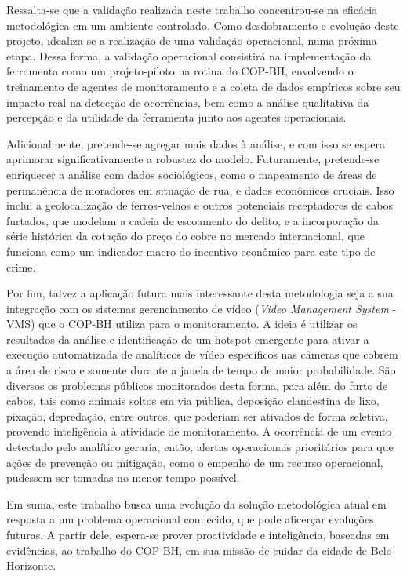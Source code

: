 Ressalta-se que a validação realizada neste trabalho concentrou-se na eficácia metodológica em um ambiente controlado. Como desdobramento e evolução deste projeto, idealiza-se a realização de uma validação operacional, numa próxima etapa. Dessa forma, a validação operacional consistirá na implementação da ferramenta como um projeto-piloto na rotina do COP-BH, envolvendo o treinamento de agentes de monitoramento e a coleta de dados empíricos sobre seu impacto real na detecção de ocorrências, bem como a análise qualitativa da percepção e da utilidade da ferramenta junto aos agentes operacionais.

Adicionalmente, pretende-se agregar mais dados à análise, e com isso se espera aprimorar significativamente a robustez do modelo. Futuramente, pretende-se enriquecer a análise com dados sociológicos, como o mapeamento de áreas de permanência de moradores em situação de rua, e dados econômicos cruciais. Isso inclui a geolocalização de ferros-velhos e outros potenciais receptadores de cabos furtados, que modelam a cadeia de escoamento do delito, e a incorporação da série histórica da cotação do preço do cobre no mercado internacional, que funciona como um indicador macro do incentivo econômico para este tipo de crime.

Por fim, talvez a aplicação futura mais interessante desta metodologia seja a sua integração com os sistemas gerenciamento de vídeo (\textit{Video Management System} - VMS) que o COP-BH utiliza para o monitoramento. A ideia é utilizar os resultados da análise e identificação de um hotspot emergente para ativar a execução automatizada de analíticos de vídeo específicos nas câmeras que cobrem a área de risco e somente durante a janela de tempo de maior probabilidade. São diversos os problemas públicos monitorados desta forma, para além do furto de cabos, tais como animais soltos em via pública, deposição clandestina de lixo, pixação, depredação, entre outros, que poderiam ser ativados de forma seletiva, provendo inteligência à atividade de monitoramento. A ocorrência de um evento detectado pelo analítico geraria, então, alertas operacionais prioritários para que ações de prevenção ou mitigação, como o empenho de um recurso operacional, pudessem ser tomadas no menor tempo possível.

Em suma, este trabalho busca uma evolução da solução metodológica atual em resposta a um problema operacional conhecido, que pode alicerçar evoluções futuras. A partir dele, espera-se prover proatividade e inteligência, baseadas em evidências, ao trabalho do COP-BH, em sua missão de cuidar da cidade de Belo Horizonte.
